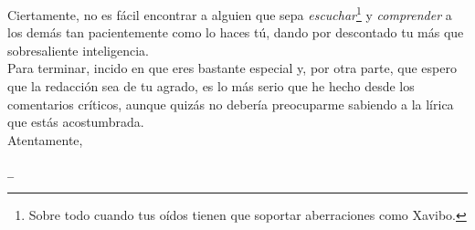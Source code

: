 \documentclass[11pt]{article}
\begin{document}
Ciertamente, no es fácil encontrar a alguien que sepa \textit{escuchar}\footnote{Sobre todo cuando tus oídos tienen que soportar aberraciones como Xavibo.} y \textit{comprender} a los demás tan pacientemente como lo haces tú, dando por descontado tu más que sobresaliente inteligencia. \\ %

\noindent Para terminar, incido en que eres bastante especial y, por otra parte, que espero que la redacción sea de tu agrado, es lo más serio que he hecho desde los comentarios críticos, aunque quizás no debería preocuparme sabiendo a la lírica que estás acostumbrada. \\

\noindent Atentamente,

\texttt{\@@samuufdzz\_}
\end{document}
